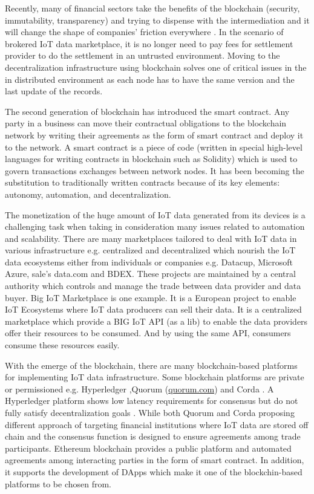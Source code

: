 \documentclass[letterpaper, 10 pt, conference]{ieeeconf}  %
\begin{document}
Recently, many of financial sectors take the benefits of the blockchain (security, immutability, transparency) and trying to dispense with the intermediation and it will change the shape of companies’ friction everywhere \cite{2}\cite{9}\cite{10}. In the scenario of brokered IoT data marketplace, it is no longer need to pay fees for settlement provider to do the settlement in an untrusted environment. Moving to the decentralization infrastructure using blockchain solves one of critical issues in the in distributed environment as each node has to have the same version and the last update of the records.

The second generation of blockchain has introduced the smart contract. Any party in a business can move their contractual obligations to the blockchain network by writing their agreements as the form of smart contract and deploy it to the network. A smart contract is a piece of code (written in special high-level languages for writing contracts in blockchain such as Solidity) which is used to govern transactions exchanges between network nodes. It has been becoming the substitution to traditionally written contracts because of its key elements: autonomy, automation, and decentralization\cite{8}.  

The monetization of the huge amount of IoT data generated from its devices is a challenging task when taking in consideration many issues related to automation and scalability. There are many marketplaces tailored to deal with IoT data in various infrastructure e.g. centralized and decentralized which nourish the IoT data ecosystems either from individuals or companies e.g. Datacup, Microsoft Azure, sale’s data.com and BDEX. These projects are maintained by a central authority which controls and manage the trade between data provider and data buyer. Big IoT Marketplace \cite{14} is one example. It is a European project to enable IoT Ecosystems where IoT data producers can sell their data. It is a centralized marketplace which provide a BIG IoT API (as a lib) to enable the data providers offer their resources to be consumed. And by using the same API, consumers consume these resources easily. 
 
 With the emerge of the blockchain, there are many blockchain-based platforms for implementing IoT data infrastructure. Some blockchain platforms are private or permissioned e.g. Hyperledger \cite{15},Quorum (\url{quorum.com}) \cite{16} and Corda \cite{17}. A Hyperledger platform shows low latency requirements for consensus but do not fully satisfy decentralization goals \cite{18}. While both Quorum and Corda proposing different approach of targeting financial institutions where IoT data are stored off chain and the consensus function is designed to ensure agreements among trade participants. Ethereum blockchain provides a public platform and automated agreements among interacting parties in the form of smart contract. In addition, it supports the development of DApps which make it one of the blockchin-based platforms to be chosen from. 
\end{document}
